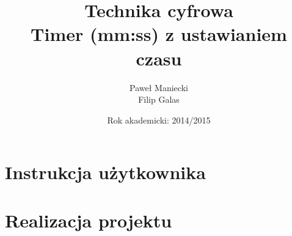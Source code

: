 \documentclass[a4paper]{report}
\title{
	\textbf{Technika cyfrowa}
	\\
	Timer (mm:ss) z ustawianiem czasu
	}
\author{
	Paweł Maniecki\\
	Filip Galas
	}
\date{Rok akademicki: 2014/2015}
\begin{document}
\maketitle

\tableofcontents

\chapter{Instrukcja użytkownika}

\chapter{Realizacja projektu}
\end{document}

